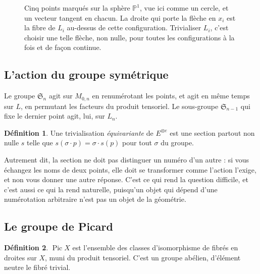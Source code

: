 \documentclass[11pt,a4paper]{amsart}
\theoremstyle{definition}
\newtheorem{definition}{Définition}
\theoremstyle{plain}
\theoremstyle{remark}
\newcommand{\M}{M_{0,n}}
\newcommand{\Sn}{\mathfrak S}
\newcommand{\Pic}{\operatorname{Pic}}
\newcommand{\PP}{\mathbb P^1}
\begin{document}
\begin{figure}[htbp]
\centering
{}
\caption{Cinq points marqués sur la sphère $\PP$, vue ici comme un cercle, et un vecteur tangent en chacun. La droite qui porte la flèche en $x_i$ est la fibre de $L_i$ au-dessus de cette configuration. Trivialiser $L_i$, c'est choisir une telle flèche, non nulle, pour toutes les configurations à la fois et de façon continue.}\label{fig:tangentes}
\end{figure}

\subsection{L'action du groupe symétrique}

Le groupe $\Sn_n$ agit sur $\M$ en renumérotant les points, et agit en même temps sur $L$, en permutant les facteurs du produit tensoriel. Le sous-groupe $\Sn_{n-1}$ qui fixe le dernier point agit, lui, sur $L_n$.

\begin{definition}
Une trivialisation \emph{équivariante} de $E^{\otimes e}$ est une section partout non nulle $s$ telle que $s(\sigma \cdot p) = \sigma \cdot s(p)$ pour tout $\sigma$ du groupe.
\end{definition}

Autrement dit, la section ne doit pas distinguer un numéro d'un autre : si vous échangez les noms de deux points, elle doit se transformer comme l'action l'exige, et non vous donner une autre réponse. C'est ce qui rend la question difficile, et c'est aussi ce qui la rend naturelle, puisqu'un objet qui dépend d'une numérotation arbitraire n'est pas un objet de la géométrie.

\subsection{Le groupe de Picard}

\begin{definition}
$\Pic X$ est l'ensemble des classes d'isomorphisme de fibrés en droites sur $X$, muni du produit tensoriel. C'est un groupe abélien, d'élément neutre le fibré trivial.
\end{definition}
\end{document}
